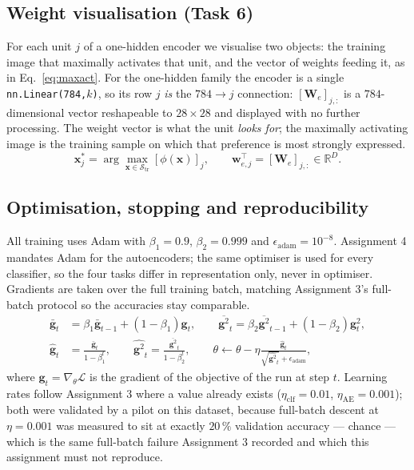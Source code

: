 \documentclass[11pt,a4paper]{article}
\newcommand{\R}{\mathbb{R}}\newcommand{\given}{\mid}\newcommand{\Acc}{\mathrm{Acc}}
\newcommand{\code}[1]{\texttt{#1}}
\begin{document}
\subsection{Weight visualisation (Task 6)}\label{sec:arch:wv}
For each unit $j$ of a one-hidden encoder we visualise two objects: the training image that
maximally activates that unit, and the vector of weights feeding it, as in Eq.~\eqref{eq:maxact}.
For the one-hidden family the encoder is a single \code{nn.Linear(784,$k$)}, so its row $j$
\emph{is} the $784\rightarrow j$ connection: $[\mathbf{W}_e]_{j,:}$ is a $784$-dimensional vector
reshapeable to $28\times28$ and displayed with no further processing.  The weight vector is what
the unit \emph{looks for}; the maximally activating image is the training sample on which that
preference is most strongly expressed.
\begin{equation}\label{eq:maxact}
\mathbf{x}^{*}_{j}=\arg\max_{\mathbf{x}\in\mathcal{S}_{\mathrm{tr}}}[\phi(\mathbf{x})]_{j},
\qquad \mathbf{w}_{e,j}^{\top}=[\mathbf{W}_e]_{j,:}\in\R^{D}.
\end{equation}

\subsection{Optimisation, stopping and reproducibility}\label{sec:arch:opt}
All training uses Adam with $\beta_1=0.9$, $\beta_2=0.999$ and $\epsilon_{\mathrm{adam}}=10^{-8}$.
Assignment 4 mandates Adam for the autoencoders; the same optimiser is used for every classifier,
so the four tasks differ in representation only, never in optimiser.  Gradients are taken over the
full training batch, matching Assignment 3's full-batch protocol so the accuracies stay
comparable.
\begin{align}
\bar{\mathbf{g}}_t &= \beta_1\bar{\mathbf{g}}_{t-1}+(1-\beta_1)\mathbf{g}_t,
  \qquad \overline{\mathbf{g}^2}_t=\beta_2\overline{\mathbf{g}^2}_{t-1}+(1-\beta_2)\mathbf{g}_t^{2},
  \label{eq:adam}\\[2pt]
\hat{\mathbf{g}}_t &= \frac{\bar{\mathbf{g}}_t}{1-\beta_1^{t}},\qquad
  \widehat{\mathbf{g}^2}_t=\frac{\overline{\mathbf{g}^2}_t}{1-\beta_2^{t}},\qquad
  \theta\leftarrow\theta-\eta\frac{\hat{\mathbf{g}}_t}{\sqrt{\widehat{\mathbf{g}^2}_t}
  +\epsilon_{\mathrm{adam}}},
\end{align}
where $\mathbf{g}_t=\nabla_{\theta}\mathcal{L}$ is the gradient of the objective of the run at
step $t$.  Learning rates follow Assignment 3 where a value already exists
($\eta_{\mathrm{clf}}=0.01$, $\eta_{\mathrm{AE}}=0.001$); both were validated by a pilot on this
dataset, because full-batch descent at $\eta=0.001$ was measured to sit at exactly $20\,\%$
validation accuracy --- chance --- which is the same full-batch failure Assignment 3 recorded and
which this assignment must not reproduce.
\end{document}
